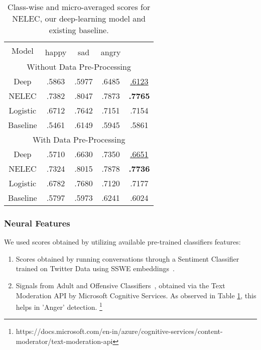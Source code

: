 \documentclass[11pt,a4paper]{article}
\begin{document}
\begin{table}[h]
\centering
 \begin{tabular}{||c |c |c |c |c||} 
 \hline
 \multirow{2}{*}{Model} & \multicolumn{4}{|c||}{} \\
 \cline{2-5}
  & happy & sad & angry & \\
 \hline  
 \hline\hline
 \multicolumn{5}{|c||}{Without Data Pre-Processing} \\
 \hline
 Deep & .5863 & .5977 & .6485 & \underline{.6123} \\ 
 \hline
 NELEC & .7382 & .8047 & .7873 & \textbf{.7765}\\
 Logistic & .6712 & .7642 & .7151 & .7154 \\
 \hline
 Baseline & .5461 & .6149 & .5945 & .5861\\
 \hline
 \multicolumn{5}{|c||}{With Data Pre-Processing} \\
 \hline
 Deep & .5710 & .6630 & .7350 & \underline{.6651} \\ 
 \hline
 NELEC &  .7324 & .8015  & .7878 & \textbf{.7736}  \\
 Logistic & .6782 & .7680 & .7120 & .7177 \\
 \hline
 Baseline & .5797 & .5973 & .6241 & .6024 \\
 \hline
 \end{tabular}
 \caption{Class-wise and micro-averaged  scores for NELEC, our deep-learning model and existing baseline.}
 \label{table:f1_results}
\end{table}

\subsubsection{Neural Features} \label{neuralfeatures}
We used scores obtained by utilizing available pre-trained classifiers features:
\begin{enumerate}
    \item Scores obtained by running conversations through a Sentiment Classifier trained on Twitter Data using SSWE embeddings~\cite{tang2014learning}. 
    \item Signals from Adult and Offensive Classifiers~\cite{yenala2017deep}, obtained via the Text Moderation API by Microsoft Cognitive Services. As observed in Table \ref{table:f1_results}, this helps in 'Anger' detection. \footnote{https://docs.microsoft.com/en-in/azure/cognitive-services/content-moderator/text-moderation-api}
\end{enumerate}
\end{document}
